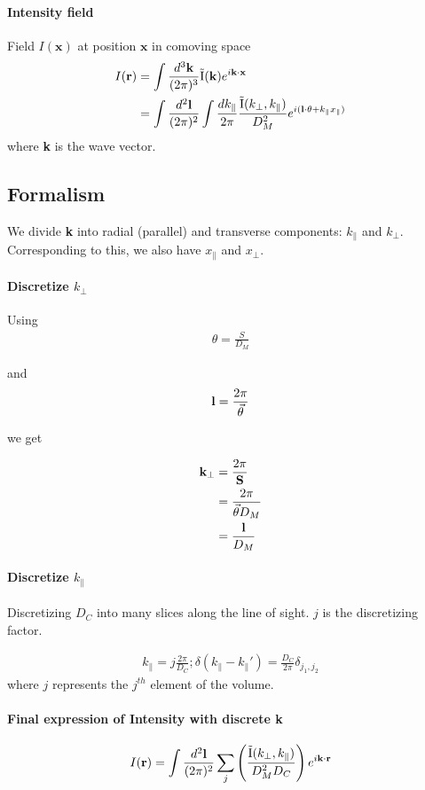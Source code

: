 \documentclass[12pt]{article}
\newcommand{\beq}{\begin{equation}}
\newcommand{\eeq}{\end{equation}}
\newcommand{\beqa}{\begin{eqnarray}}
\newcommand{\eeqa}{\end{eqnarray}}
\newcommand{\beqal}{\begin{aligned}}
\newcommand{\eeqal}{\end{aligned}}
\def\k{{\bf k}}
\def\l{{\bf l}}
\def\r{{\bf r}}
\def\x{{\bf x}}
\def\il{{\tilde{\rm I}}}
\numberwithin{equation}{section}
\begin{document}
\paragraph{Intensity field}
Field $ I(\textbf{x}) $ at position $ \textbf{x} $ in comoving space
\beq
\beqal
I(\textbf{r}) &= \int \frac{d^3\k}{(2\pi)^3} \il(\k) e^{i \k \cdot \x}
\\
&= \int \frac{d^2\l}{(2\pi)^2} \int \frac{dk_{\parallel}}{2\pi} \frac{\il(k_\perp, k_\parallel)}{D_M^2} e^{i(\l\cdot \theta + k_\parallel x_\parallel)}
\eeqal
\eeq
where \textbf{k} is the wave vector.

\subsection{Formalism}
We divide \textbf{k} into radial (parallel) and transverse components: $ k_\parallel $ and $ k_\perp $. Corresponding to this, we also have $ x_\parallel $ and $ x_\perp $.

\paragraph{Discretize $k_\perp$} Using
\beqa
\theta = \frac{S}{D_M}
\eeqa

and 
\beqa
\l = \frac{2 \pi}{\vec{\theta}}
\eeqa

we get 

\beq
\beqal
\k_\perp &= \frac{2 \pi}{\textbf{S}}
\\
&= \frac{2 \pi }{\vec{\theta} D_M}
\\
&= \frac{\l}{D_M}
\eeqal
\eeq

\paragraph{Discretize $ k_\parallel $}Discretizing $ D_C $ into many slices along the line of sight. $ j $ is the discretizing factor.

\beqa
k_\parallel  = j\frac{2\pi}{D_C}; \delta(k_\parallel - k_\parallel') = \frac{D_C}{2\pi} \delta_{j_1, j_2} 
\eeqa
where $ j $ represents the $ j^{th} $ element of the volume.

\paragraph{Final expression of Intensity with discrete \textbf{k}}
\beqa
I(\r) = \int\frac{d^2\l}{(2\pi)^2} \sum_j \left(\frac{\il(k_\perp, k_\parallel)}{D_M^2 D_C} \right) e^{i \textbf{k} \cdot \textbf{r}}
\eeqa
\end{document}
